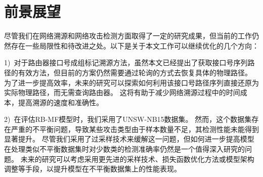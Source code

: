 \section{前景展望}
尽管我们在网络溯源和网络攻击检测方面取得了一定的研究成果，但当前的工作仍然存在一些局限性和待改进之处。以下是关于本文工作可以继续优化的几个方向：\par

1)~对于路由器接口号成组标记溯源方法，虽然本文已经提出了获取接口号序列路径的有效方法，但目前的方案仍然需要通过轮询的方式去恢复具体的物理路径。
为了进一步提高效率，未来的研究可以探索如何利用该接口号路径序列直接还原为实际物理路径，而无需查询路由器。
这将有助于减少网络溯源过程中的时间成本，提高溯源的速度和准确性。\par

2)~在评估RB-MF模型时，我们采用了UNSW-NB15数据集。
然而，这个数据集存在严重的不平衡问题，导致某些攻击类型由于样本数量不足，其检测性能未能得到显著提升。
尽管我们采用了过采样技术来缓解这一问题，但如何进一步提高模型在处理类似不平衡数据集时对少数类的检测准确率仍然是一个值得深入研究的问题。
未来的研究可以考虑采用更先进的采样技术、损失函数优化方法或模型架构调整等手段，以提升模型在不平衡数据集上的性能表现。\par